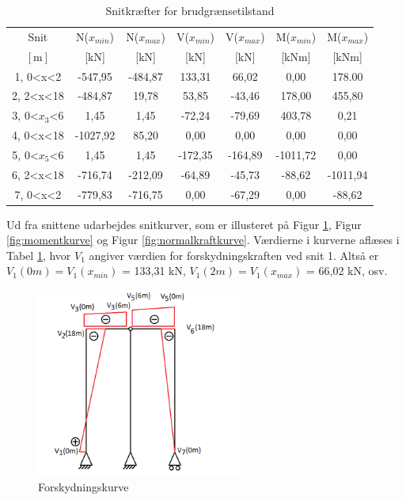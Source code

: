 \begin{table} [H]
	\begin{center}
		\begin{tabular}{c c c c c c c}
			\hline
			Snit & N($x_{min}$) & N($x_{max}$) & V($x_{min}$) & V($x_{max}$) & M($x_{min}$) & M($x_{max}$) 	\\ 
			$[\text{m}]$ & [kN] & [kN] & [kN] & [kN] & [kNm] & [kNm] \\ \hline
			1, 0<x<2  & -547,95       & -484,87    	&  133,31    	&  66,02 	&  0,00     &  178.00        		\\ 
			2, 2<x<18 &  -484,87        &  19,78       &  53,85      & -43,46   &  178,00  &  455,80    \\ 
			3, 0<$x_3$<6  & 1,45       &  1,45     &  -72,24         &  -79,69     &  403,78     &  0,21 			    \\
			4, 0<x<18 &  -1027,92       &  85,20      &  0,00        &  0,00    &  0,00   &   0,00    \\ 
			5, 0<$x_5$<6  &  1,45     &    1,45      &  -172,35      &  -164,89     &   -1011,72        &   0,00      		\\ 
			6, 2<x<18 &  -716,74  &   -212,09  &   -64,89    &   -45,73    &    -88,62       &   -1011,94      		\\ 
			7, 0<x<2 &  -779,83        &   -716,75       &     0,00      &   -67,29   &    0,00     &    -88,62     		\\ 
		\end{tabular}
		\caption{Snitkræfter for brudgrænsetilstand}
		\label{tab:resultaterbrud}
	\end{center}
\end{table}

Ud fra snittene udarbejdes snitkurver, som er illusteret på Figur \ref{fig:forskydningskurve}, Figur \ref{fig:momentkurve} og Figur \ref{fig:normalkraftkurve}. Værdierne i kurverne aflæses i Tabel \ref{tab:resultaterbrud}, hvor $V_1$ angiver værdien for forskydningskraften ved snit 1. Altså er $V_1(0m) = V_1(x_{min})$ = 133,31 kN, $V_1(2m) = V_1(x_{max})$ = 66,02 kN, osv.

\begin{figure}[H]
	\centering
	\includegraphics[width=0.6\textwidth]{billeder/sk.png}
	\caption{Forskydningskurve}
	\label{fig:forskydningskurve}
\end{figure}


